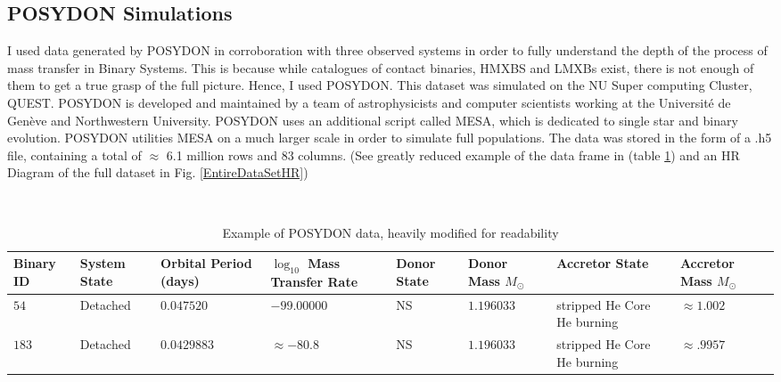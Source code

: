 \documentclass[12pt, a4paper]{article}
\begin{document}
    \subsection{POSYDON Simulations}
         I used data generated by POSYDON \cite{Fragos_2023} in corroboration with three observed systems in order to fully understand the depth of the process of mass transfer in Binary Systems. This is because while catalogues of contact binaries, HMXBS and LMXBs exist, there is not enough of them to get a true grasp of the full picture. Hence, I used POSYDON. This dataset was simulated on the NU Super computing Cluster, QUEST. POSYDON is developed and maintained by a team of astrophysicists and computer scientists working at the Université de Genève and Northwestern University. POSYDON uses an additional script called MESA, which is dedicated to single star and binary evolution. POSYDON utilities MESA on a much larger scale in order to simulate full populations. The data was stored in the form of a .h5 file, containing a total of $\approx$ 6.1 million rows and 83 columns. (See greatly reduced example of the data frame in (table \ref{POSYDONDataExample}) and an HR Diagram of the full dataset in Fig. \ref{EntireDataSetHR})

         \begin{table}
            \centering\
            \footnotesize
            \begin{tabularx}{\textwidth}{||X | X | X | X | X | X | X | X ||}
                \hline 
                \textbf{Binary ID} & 
                \textbf{System State} & 
                \textbf{Orbital Period (days)} & 
                \boldmath$\log_{10}$ \textbf{Mass Transfer Rate} & 
                \textbf{Donor State} & 
                \textbf{Donor Mass} $M_\odot$ & 
                \textbf{Accretor State} & 
                \textbf{Accretor Mass} $M_\odot$
                \\ \hline \hline
                $54$ & Detached & $0.047520$ & $-99.00000$ & NS & $1.196033$ & stripped He Core He burning & $\approx 1.002$ \\
                \hline
                $183$ & Detached & $0.0429883$ & $ \approx -80.8$ & NS & $1.196033$ & stripped He Core He burning & $\approx .9957$ \\
                \hline
            \end{tabularx}
            \caption{Example of POSYDON data, heavily modified for readability}
            \label{POSYDONDataExample}
        \end{table}
\end{document}
